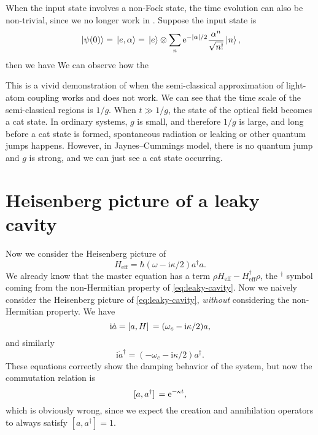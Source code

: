 \documentclass[hyperref, a4paper]{article}
\newcommand*{\ii}{\mathrm{i}}
\newcommand*{\ee}{\mathrm{e}}
\begin{document}
When the input state involves a non-Fock state, the time evolution can also be non-trivial, since we no longer 
work in . Suppose the input state is 
\begin{equation}
    \ket*{\psi(0)} = \ket*{e, \alpha} = \ket*{e} \otimes \sum_{n} \ee^{- \abs*{\alpha} / 2} \frac{\alpha^n}{\sqrt{n!}} \ket*{n},
\end{equation}
then we have 
We can observe how the 

This is a vivid demonstration of when the semi-classical approximation of light-atom coupling works and does not 
work. We can see that the time scale of the semi-classical regions is $1 / g$. When $t \gg 1 / g$, the state of 
the optical field becomes a cat state. In ordinary systems, $g$ is small, and therefore $1/g$ is large, and long 
before a cat state is formed, spontaneous radiation or leaking or other quantum jumps happens. However, 
in Jaynes–Cummings model, there is no quantum jump and $g$ is strong, and we can just see a cat state occurring. 

\section{Heisenberg picture of a leaky cavity}

Now we consider the Heisenberg picture of 
\begin{equation}
    H_\text{eff} = \hbar (\omega - \ii \kappa / 2) a^\dagger a.
    \label{eq:leaky-cavity}
\end{equation}
We already know that the master equation has a term $\rho H_\text{eff} - H_\text{eff}^\dagger \rho$, 
the $^\dagger$ symbol coming from the non-Hermitian property of \eqref{eq:leaky-cavity}. 
Now we naively consider the Heisenberg picture of \eqref{eq:leaky-cavity}, \emph{without} considering 
the non-Hermitian property. We have 
\[
    \ii \dot{a} = \comm*{a}{H} = (\omega_c - \ii \kappa / 2) a, 
\]
and similarly 
\[
    \ii \dot{a}^\dagger = (- \omega_c - \ii \kappa / 2) a^\dagger.
\]
These equations correctly show the damping behavior of the system, but now the commutation relation is 
\[
    \comm*{a}{a^\dagger} = \ee^{- \kappa t},
\]
which is obviously wrong, since we expect the creation and annihilation operators to always satisfy 
$[a, a^\dagger] = 1$. 
\end{document}
